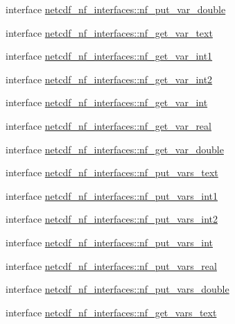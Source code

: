 \begin{DoxyCompactItemize}
\item 
interface \hyperlink{interfacenetcdf__nf__interfaces_1_1nf__put__var__double}{netcdf\+\_\+nf\+\_\+interfaces\+::nf\+\_\+put\+\_\+var\+\_\+double}
\item 
interface \hyperlink{interfacenetcdf__nf__interfaces_1_1nf__get__var__text}{netcdf\+\_\+nf\+\_\+interfaces\+::nf\+\_\+get\+\_\+var\+\_\+text}
\item 
interface \hyperlink{interfacenetcdf__nf__interfaces_1_1nf__get__var__int1}{netcdf\+\_\+nf\+\_\+interfaces\+::nf\+\_\+get\+\_\+var\+\_\+int1}
\item 
interface \hyperlink{interfacenetcdf__nf__interfaces_1_1nf__get__var__int2}{netcdf\+\_\+nf\+\_\+interfaces\+::nf\+\_\+get\+\_\+var\+\_\+int2}
\item 
interface \hyperlink{interfacenetcdf__nf__interfaces_1_1nf__get__var__int}{netcdf\+\_\+nf\+\_\+interfaces\+::nf\+\_\+get\+\_\+var\+\_\+int}
\item 
interface \hyperlink{interfacenetcdf__nf__interfaces_1_1nf__get__var__real}{netcdf\+\_\+nf\+\_\+interfaces\+::nf\+\_\+get\+\_\+var\+\_\+real}
\item 
interface \hyperlink{interfacenetcdf__nf__interfaces_1_1nf__get__var__double}{netcdf\+\_\+nf\+\_\+interfaces\+::nf\+\_\+get\+\_\+var\+\_\+double}
\item 
interface \hyperlink{interfacenetcdf__nf__interfaces_1_1nf__put__vars__text}{netcdf\+\_\+nf\+\_\+interfaces\+::nf\+\_\+put\+\_\+vars\+\_\+text}
\item 
interface \hyperlink{interfacenetcdf__nf__interfaces_1_1nf__put__vars__int1}{netcdf\+\_\+nf\+\_\+interfaces\+::nf\+\_\+put\+\_\+vars\+\_\+int1}
\item 
interface \hyperlink{interfacenetcdf__nf__interfaces_1_1nf__put__vars__int2}{netcdf\+\_\+nf\+\_\+interfaces\+::nf\+\_\+put\+\_\+vars\+\_\+int2}
\item 
interface \hyperlink{interfacenetcdf__nf__interfaces_1_1nf__put__vars__int}{netcdf\+\_\+nf\+\_\+interfaces\+::nf\+\_\+put\+\_\+vars\+\_\+int}
\item 
interface \hyperlink{interfacenetcdf__nf__interfaces_1_1nf__put__vars__real}{netcdf\+\_\+nf\+\_\+interfaces\+::nf\+\_\+put\+\_\+vars\+\_\+real}
\item 
interface \hyperlink{interfacenetcdf__nf__interfaces_1_1nf__put__vars__double}{netcdf\+\_\+nf\+\_\+interfaces\+::nf\+\_\+put\+\_\+vars\+\_\+double}
\item 
interface \hyperlink{interfacenetcdf__nf__interfaces_1_1nf__get__vars__text}{netcdf\+\_\+nf\+\_\+interfaces\+::nf\+\_\+get\+\_\+vars\+\_\+text}

\end{DoxyCompactItemize}
